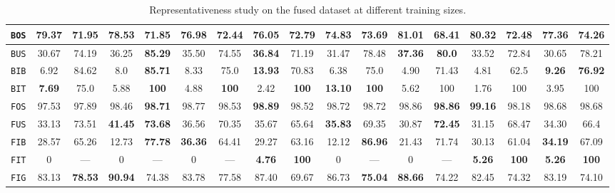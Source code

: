 \begin{sidewaystable}
\begin{center}
\begin{tabular}{|c | c c | c c | c c | c c || c c | c c | c c | c c |}
                    \hline
                    \texttt{BOS} & \textbf{79.37} & 71.95 & 78.53 & 71.85 & 76.98 & 72.44 & 76.05 & \textbf{72.79} & 74.83 & 73.69 & \textbf{81.01} & 68.41 & 80.32 & 72.48 & 77.36 & \textbf{74.26} \\
                    \hline
                    \texttt{BUS} & 30.67 & 74.19 & 36.25 & \textbf{85.29} & 35.50 & 74.55 & \textbf{36.84} & 71.19 & 31.47 & 78.48 & \textbf{37.36} & \textbf{80.0} & 33.52 & 72.84 & 30.65 & 78.21 \\
                    \hline
                    \texttt{BIB} & 6.92 & 84.62 & 8.0 & \textbf{85.71} & 8.33 & 75.0 & \textbf{13.93} & 70.83 & 6.38 & 75.0 & 4.90 & 71.43 & 4.81 & 62.5 & \textbf{9.26} & \textbf{76.92} \\
                    \hline
                    \texttt{BIT} & \textbf{7.69} & 75.0 & 5.88 & \textbf{100} & 4.88 & \textbf{100} & 2.42 & \textbf{100} & \textbf{13.10} & \textbf{100} & 5.62 & 100 & 1.76 & 100 & 3.95 & 100 \\
                    \hline
                    \texttt{FOS} & 97.53 & 97.89 & 98.46 & \textbf{98.71} & 98.77 & 98.53 & \textbf{98.89} & 98.52 & 98.72 & 98.72 & 98.86 & \textbf{98.86} & \textbf{99.16} & 98.18 & 98.68 & 98.68 \\
                    \hline
                    \texttt{FUS} & 33.13 & 73.51 & \textbf{41.45} & \textbf{73.68} & 36.56 & 70.35 & 35.67 & 65.64 & \textbf{35.83} & 69.35 & 30.87 & \textbf{72.45} & 31.15 & 68.47 & 34.30 & 66.4 \\
                    \hline
                    \texttt{FIB} & 28.57 & 65.26 & 12.73 & \textbf{77.78} & \textbf{36.36} & 64.41 & 29.27 & 63.16 & 12.12 & \textbf{86.96} & 21.43 & 71.74 & 30.13 & 61.04 & \textbf{34.19} & 67.09 \\
                    \hline
                    \texttt{FIT} & 0 & --- & 0 & --- & 0 & --- & \textbf{4.76} & \textbf{100} & 0 & --- & 0 & --- & \textbf{5.26} & \textbf{100} & \textbf{5.26} & \textbf{100} \\
                    \hline
                    \texttt{FIG} & 83.13 & \textbf{78.53} & \textbf{90.94} & 74.38 & 83.78 & 77.58 & 87.40 & 69.67 & 86.73 & \textbf{75.04} & \textbf{88.66} & 74.22 & 82.45 & 74.32 & 83.19 & 74.10 \\
                    \hline
                \end{tabular}
                \caption{\label{tab::representativeness_f3} Representativeness study on the fused dataset at different training sizes.}
            \end{center}
        \end{sidewaystable}

